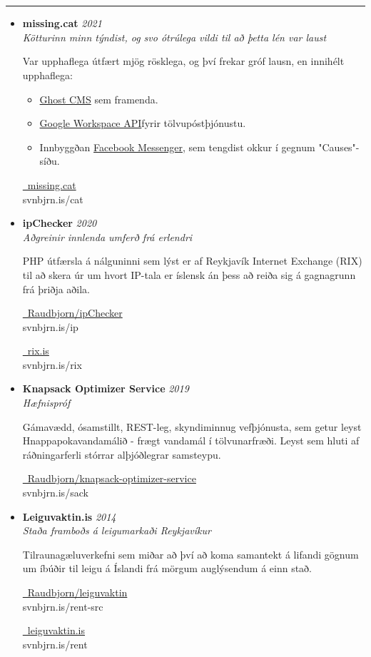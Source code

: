 \documentclass[a4paper,10pt]{article}
\newcommand{\tr}[2]{%
    \iflanguage{icelandic}{#1}{#1}%
  }
\newcommand{\sectionProjects}{\tr{Verkefni}{Notable Projects}}
\newcommand{\projectentry}[5]{%
    \item 
    \textbf{#1} \hfill \textit{#2}\\
    \textit{#3}\\[0.1cm]
    \begin{minipage}[t]{\linewidth}
        #4
        \vspace{0.2cm}
        #5
    \end{minipage}
    \vspace{0.3cm}
}
\newcommand{\projectlink}[3]{%
  \noindent%
  \hspace*{0.35\linewidth}%
  \begin{minipage}[t]{0.65\linewidth}%
    \raggedright%
    \href{#1}{#2}\\[-0.1cm]%
    \hfill{\small\textcolor{secondarytext}{\ttfamily #3}}\\[-0.1cm]
    {\color{secondarytext}\hrulefill}%
  \end{minipage}%
  \vspace{0.2cm}%
}
\newcommand{\cvheading}[1]{%
    {\headingfont\section*{#1}}
    \vspace{-0.2cm}
    \hrule
    \vspace{0.2cm}
  }
\begin{document}
  \cvheading{\sectionProjects}
  \begin{itemize}[leftmargin=2em]
    \projectentry{missing.cat}{2021}
    {Kötturinn minn týndist, og svo ótrúlega vildi til að þetta lén var laust}
     {Var upphaflega útfært mjög rösklega, og því frekar gróf lausn, en innihélt upphaflega:
      \begin{itemize}
        \item \href{https://ghost.org/}{Ghost CMS} sem framenda.
        \item \href{https://developers.google.com/gmail/api}{Google Workspace API}{fyrir tölvupóstþjónustu.}
        \item Innbyggðan \href{https://developers.facebook.com/docs/messenger-platform/}{Facebook Messenger}, sem tengdist okkur í gegnum "Causes"-síðu.
      \end{itemize}
      }
    {\projectlink{https://missing.cat/}{\faLink\ missing.cat}{svnbjrn.is/cat}}


    \projectentry{ipChecker}{2020}
    {Aðgreinir innlenda umferð frá erlendri}
   {PHP útfærsla á nálguninni sem lýst er af Reykjavík Internet Exchange (RIX) til að skera úr um hvort IP-tala er íslensk án þess að reiða sig á gagnagrunn frá þriðja aðila.\\}
  {\projectlink{https://github.com/Raudbjorn/ipChecker}{\faGithub\ Raudbjorn/ipChecker}{svnbjrn.is/ip}}
  {\projectlink{https://www.rix.is/is-as-nets}{\faLink\ rix.is}{svnbjrn.is/rix}}

  

  \projectentry{Knapsack Optimizer Service}{2019}
  {Hæfnispróf}
  {Gámavædd, ósamstillt, REST-leg, skyndiminnug vefþjónusta, sem getur leyst Hnappapokavandamálið - frægt vandamál í tölvunarfræði. Leyst sem hluti af ráðningarferli stórrar alþjóðlegrar samsteypu.\\}
  {\projectlink{https://github.com/Raudbjorn/knapsack-optimizer-service}{\faGithub\ Raudbjorn/knapsack-optimizer-service}{svnbjrn.is/sack}}
 
  \newpage

 \projectentry{Leiguvaktin.is}{2014}
   {Staða framboðs á leigumarkaði Reykjavíkur}
   {Tilraunagæluverkefni sem miðar að því að koma samantekt á lifandi gögnum um íbúðir til leigu á Íslandi frá mörgum auglýsendum á einn stað.}  
   {\projectlink{https://github.com/Raudbjorn/leiguvaktin}{\faGithub\ Raudbjorn/leiguvaktin}{svnbjrn.is/rent-src}}
  {\projectlink{https://web.archive.org/web/20160111052408/http://leiguvaktin.is/}{\faLink\ leiguvaktin.is}{svnbjrn.is/rent}}


 \end{itemize}
\end{document}
